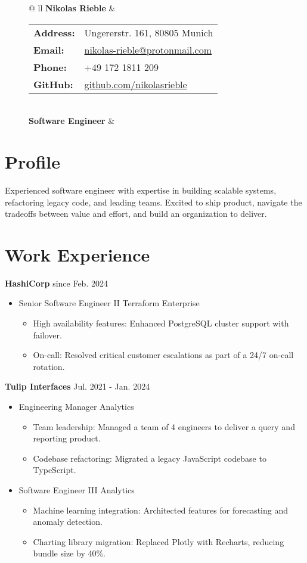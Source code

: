 \documentclass[letterpaper,11pt]{article}
\newcommand{\roleSpacing}{\vspace{4pt}}
\newcommand{\role}[2]{\item{#1 \hfill #2 \\}} %
\newcommand{\station}[2]{\textbf{#1}  \hfill #2 \\} %
\newcommand{\project}[2]{\item\small{#1: #2}} %
\newcommand{\resumeSubHeadingListStart}{\begin{itemize}[leftmargin=*]}
\newcommand{\resumeSubHeadingListEnd}{\end{itemize}}
\newcommand{\projectliststart}{\begin{itemize}[leftmargin=*] \vspace{-5pt} }
\newcommand{\projectlistend}{\end{itemize}\vspace{-5pt}}
\begin{document}
\addtolength{\tabcolsep}{4pt}    %
{\renewcommand{\arraystretch}{1} %
\begin{figure}[t]
	\centering
	\begin{tabular*}{\textwidth}{@{\extracolsep{\fill}} ll}
		 \textbf{{\Huge Nikolas Rieble}} & 
		\begin{tabular}{@{}ll@{}}
			\textbf{Address:} & Ungererstr. 161, 80805 Munich \\
			\textbf{Email:} & \href{mailto:nikolas-rieble@protonmail.com}{nikolas-rieble@protonmail.com} \\
			\textbf{Phone:} & +49 172 1811 209 \\
			\textbf{GitHub:} & \href{https://github.com/nikolasrieble}{github.com/nikolasrieble} \\
		\end{tabular} \\
		\textbf{Software Engineer} & \\
	\end{tabular*}
\end{figure}
}

\section{Profile}
Experienced software engineer with expertise in building scalable systems, refactoring legacy code, and leading teams. Excited to ship product, navigate the tradeoffs between value and effort, and build an organization to deliver.

\section{Work Experience}

\station{HashiCorp}{since Feb. 2024}
\resumeSubHeadingListStart
\role{Senior Software Engineer II}{Terraform Enterprise}
\projectliststart
\project{High availability features}{Enhanced PostgreSQL cluster support with failover.}
\project{On-call}{Resolved critical customer escalations as part of a 24/7 on-call rotation.}
\projectlistend
\resumeSubHeadingListEnd

\roleSpacing

\station{Tulip Interfaces}{Jul. 2021 - Jan. 2024}
\resumeSubHeadingListStart
\role{Engineering Manager}{Analytics}
\projectliststart
\project{Team leadership}{Managed a team of 4 engineers to deliver a query and reporting product.}
\project{Codebase refactoring}{Migrated a legacy JavaScript codebase to TypeScript.}
\projectlistend
\roleSpacing
\role{Software Engineer III}{Analytics}
\projectliststart
\project{Machine learning integration}{Architected features for forecasting and anomaly detection.}
\project{Charting library migration}{Replaced Plotly with Recharts, reducing bundle size by 40\%.}
\projectlistend
\resumeSubHeadingListEnd
\end{document}

